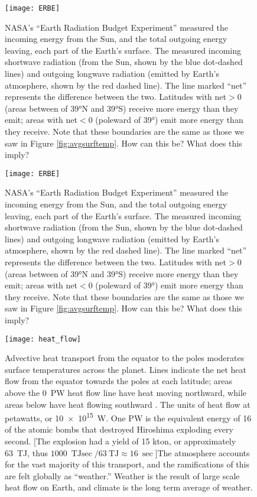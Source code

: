 \begin{figure}[p]
\centering
\texttt{[image: ERBE]}%
\caption{NASA's ``Earth Radiation Budget Experiment'' measured the incoming energy from the Sun, and the total outgoing energy leaving, each part of the Earth's surface. The measured incoming shortwave radiation (from the Sun, shown by the blue dot-dashed lines) and outgoing longwave radiation (emitted by Earth's atmosphere, shown by the red dashed line). The line marked ``net'' represents the difference between the two. Latitudes with net$>0$(areas between of \ang{39}N and \ang{39}S) receive more energy than they emit; areas with net$<0$ (poleward of \ang{39}) emit more energy than they receive. Note that these boundaries are the same as those we saw in Figure \ref{fig:avgsurftemp}. How can this be? What does this imply? }   
\label{fig:erbe}
\end{figure}

\begin{figure}[p]
\centering
\texttt{[image: ERBE]}%
\caption{NASA's ``Earth Radiation Budget Experiment'' measured the incoming energy from the Sun, and the total outgoing energy leaving, each part of the Earth's surface. The measured incoming shortwave radiation (from the Sun, shown by the blue dot-dashed lines) and outgoing longwave radiation (emitted by Earth's atmosphere, shown by the red dashed line). The line marked ``net'' represents the difference between the two. Latitudes with net$>0$(areas between of \ang{39}N and \ang{39}S) receive more energy than they emit; areas with net$<0$ (poleward of \ang{39}) emit more energy than they receive. Note that these boundaries are the same as those we saw in Figure \ref{fig:avgsurftemp}. How can this be? What does this imply? }   
\label{fig:erbe}
\end{figure}


\begin{figure}[p]
\centering
\texttt{[image: heat\_flow]}%
\caption{Advective heat transport from the equator to the poles moderates surface temperatures across the planet. Lines indicate the net heat flow from the equator towards the poles at each latitude; areas above the \SI{0}{\peta\watt} heat flow line have heat moving northward, while areas below have heat flowing southward . The units of heat flow at petawatts, or \SI{10e15}{\watt}. One \si{\peta\watt} is the equivalent energy of 16 of the atomic bombs that destroyed Hiroshima exploding every second. [The explosion had a yield of 15 kton, or approximately \SI{63}{\tera\joule}, thus $\SI{1000}{\tera\joule\sec}/\SI{63}{\tera\joule}\approx \SI{16}{\sec}$]The atmosphere accounts for the vast majority of this transport, and the ramifications of this are felt globally as ``weather.'' Weather is the result of large scale heat flow on Earth, and climate is the long term average of weather.}   
\label{fig:heatflow}
\end{figure}


